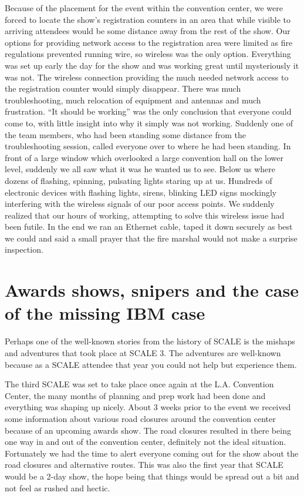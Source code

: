 Because of the placement for the event within the convention center, we were
forced to locate the show's registration counters in an area that while visible
to arriving attendees would be some distance away from the rest of the show. 
Our options for providing network access to the registration area were limited as
fire regulations prevented running wire, so wireless was the only option. Everything was set up early the day for the show and was working great until mysteriously it was not. The wireless connection providing the much needed network access to the registration counter would simply disappear. There was much troubleshooting, much relocation of equipment and antennas and much frustration. ``It should be working'' was the only conclusion that everyone could come to, with little insight into why it simply was not working. Suddenly one of the team members, who had been standing some distance from the troubleshooting session, called everyone over to where he had been standing. In front of a large window which overlooked a large convention hall on the lower level, suddenly we all saw what it was he wanted us to see. Below us where dozens of flashing, spinning, pulsating lights staring up at us. Hundreds of electronic devices with flashing lights, sirens, blinking LED signs mockingly interfering with the wireless signals of our poor access points.
We suddenly realized that our hours of working, attempting to solve this
wireless issue had been futile. In the end we ran an Ethernet cable, taped it down securely as best we could and said a small prayer that the fire marshal
would not make a surprise inspection.

\section*{Awards shows, snipers and the case of the missing IBM case}

Perhaps one of the well-known stories from the history of SCALE is the mishaps
and adventures that took place at SCALE 3. The adventures are well-known because
as a SCALE attendee that year you could not help but experience them.

The third SCALE was set to take place once again at the L.A. Convention Center,
the many months of planning and prep work had been done and everything was
shaping up nicely. About 3 weeks prior to the event we received some
information about various road closures around the convention center because of
an upcoming awards show. The road closures resulted in there being one way in
and out of the convention center, definitely not the ideal situation. 
Fortunately we had the time to alert everyone coming out for the show about the
road closures and alternative routes. This was also the first year that SCALE
would be a 2-day show, the hope being that things would be spread out a bit and
not feel as rushed and hectic.

